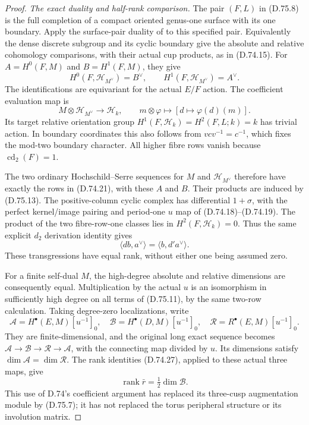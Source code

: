 \begin{proof}
\emph{The exact duality and half-rank comparison.}
The pair $(F,L)$ in (D.75.8) is the full completion
of a compact oriented genus-one surface with its
one boundary.  Apply the
surface-pair duality of
\cite[Propositions~5.7 and~6.16 of the accepted version]
{C-WilkesRelativeAccepted2018} to this specified pair.
Equivalently the dense discrete subgroup and its
cyclic boundary give the absolute and relative
cohomology comparisons, with their actual cup products,
as in (D.74.15).  For
$A=H^0(F,M)$ and $B=H^1(F,M)$, they give
\[
 H^0(F,\mathscr H_{M^\vee})=B^\vee,\qquad
 H^1(F,\mathscr H_{M^\vee})=A^\vee .
                                                               \tag{D.75.12}
\]
The identifications are equivariant for the actual
$E/F$ action.  The coefficient evaluation map is
\[
 M\otimes\mathscr H_{M^\vee}\longrightarrow\mathscr H_k,
 \qquad m\otimes\varphi\longmapsto
                 [d\longmapsto\varphi(d)(m)] .
                                                               \tag{D.75.13}
\]
Its target relative orientation group
$H^1(F,\mathscr H_k)=H^2(F,L;k)=k$ has trivial action.
In boundary coordinates this also follows from
$v c v^{-1}=c^{-1}$, which fixes the mod-two
boundary character.  All higher fibre rows vanish
because $\operatorname{cd}_2(F)=1$.

The two ordinary Hochschild--Serre sequences for
$M$ and $\mathscr H_{M^\vee}$ therefore have exactly
the rows in (D.74.21), with these $A$ and $B$.
Their products are induced by (D.75.13).
The positive-column cyclic complex has differential
$1+\sigma$, with the perfect kernel/image pairing
and period-one $u$ map of (D.74.18)--(D.74.19).
The product of the two fibre-row-one classes lies
in $H^2(F,\mathscr H_k)=0$.  Thus the same explicit
$d_2$ derivation identity gives
\[
                    \langle db,a^\vee\rangle
                          =\langle b,d'a^\vee\rangle .
                                                               \tag{D.75.14}
\]
These transgressions have equal rank, without
either one being assumed zero.

For a finite self-dual $M$, the high-degree
absolute and relative dimensions are consequently
equal.  Multiplication by the actual $u$ is an
isomorphism in sufficiently high degree on all
terms of (D.75.11), by the same two-row calculation.
Taking degree-zero localizations, write
\[
 \mathcal A=H^\bullet(E,M)[u^{-1}]_0,\quad
 \mathcal B=H^\bullet(D,M)[u^{-1}]_0,\quad
 \mathcal R=R^\bullet(E,M)[u^{-1}]_0 .
                                                               \tag{D.75.15}
\]
They are finite-dimensional, and the original
long exact sequence becomes
$\mathcal A\to\mathcal B\to\mathcal R\to\mathcal A$,
with the connecting map divided by $u$.
Its dimensions satisfy $\dim\mathcal A=\dim\mathcal R$.
The rank identities (D.74.27), applied to these
actual three maps, give
\[
                     \operatorname{rank}\bar r
                                  =\tfrac12\dim\mathcal B .
                                                               \tag{D.75.16}
\]
This use of D.74's coefficient argument has
replaced its three-cusp augmentation module
by (D.75.7); it has not replaced the torus
peripheral structure or its involution matrix.


\end{proof}
